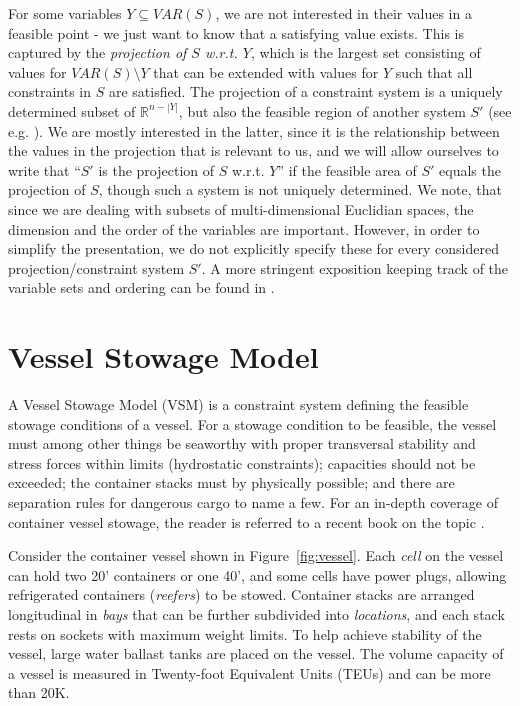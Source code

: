 \documentclass{llncs}
\newcommand{\VAR}{\mathit{VAR}}
\begin{document}
For some variables $Y\subseteq \VAR(S)$, we are not interested in their values in a feasible point - we just want to know that a satisfying value exists. This is captured by the \emph{projection of $S$ w.r.t. $Y$}, which is the largest set consisting of values for $\VAR(S)\setminus Y$ that can be extended with values for $Y$ such that all constraints in $S$ are satisfied. 
%
The projection of a constraint system is a uniquely determined subset of $\mathbb{R}^{n-|Y|}$, but also the feasible region of another system $S'$ (see e.g. \cite{ziegler95}). We are mostly interested in the latter, since it is the relationship between the values in the projection that is relevant to us, and we will allow ourselves to write that ``$S'$ is the projection of $S$ w.r.t. $Y$'' if the feasible area of $S'$ equals the projection of $S$, though such a system is not uniquely determined.
We note, that since we are dealing with subsets of multi-dimensional Euclidian spaces, the dimension and the order of the variables are important. However, in order to simplify the presentation, we do not explicitly specify these for every considered projection/constraint system $S'$. A more stringent exposition keeping track of the variable sets and ordering can be found in \cite{mytechrep}.
\section{Vessel Stowage Model}\label{sec:model}
A Vessel Stowage Model (VSM) is a constraint system defining the feasible stowage conditions of a vessel. For a stowage condition to be feasible, the vessel must among other things be seaworthy with proper transversal stability and stress forces within limits (hydrostatic constraints); 
capacities should not be exceeded; the container stacks must by physically possible; %
and there are separation rules for dangerous cargo to name a few. For an in-depth coverage of container vessel stowage, the reader is referred to a recent book on the topic \cite{JPAV18}.     

Consider the container vessel shown in Figure~\ref{fig:vessel}. Each \emph{cell} on the vessel can hold two 20' containers or one 40', and some cells have power plugs, allowing refrigerated containers (\emph{reefers}) to be stowed. Container stacks are arranged longitudinal in \emph{bays} that can be further subdivided into \emph{locations}, and each stack rests on sockets with maximum weight limits. To help achieve stability of the vessel, large water ballast tanks are placed on the vessel.
The volume capacity of a vessel is measured in Twenty-foot Equivalent Units (TEUs) and can be more than 20K. 
\end{document}
